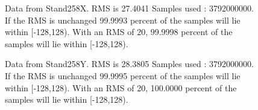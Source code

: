 \begin{figure}[h] 				 				 				\caption{Data from Stand258X. RMS is 27.4041 Samples used : 3792000000. If the RMS is unchanged 99.9993 percent of the samples will lie within [-128,128).  				 With an RMS of 20, 99.9998 percent of the samples will lie within [-128,128).} 				\end{figure} 

\begin{figure}[h] 				 				 				\caption{Data from Stand258Y. RMS is 28.3805 Samples used : 3792000000. If the RMS is unchanged 99.9995 percent of the samples will lie within [-128,128).  				 With an RMS of 20, 100.0000 percent of the samples will lie within [-128,128).} 				\end{figure} 

